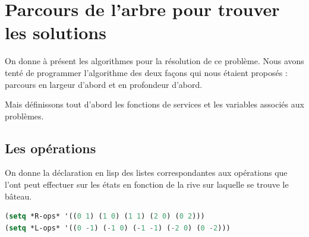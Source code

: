 \documentclass[a4paper, 12pt, leqno]{report}
\theoremstyle{plain}
\begin{document}
            
             \chapter{Parcours de l'arbre pour trouver les solutions}
             On donne à présent les algorithmes pour la résolution de ce problème. Nous avons tenté de programmer l'algorithme des deux façons qui nous étaient proposés : parcours en largeur d'abord et en profondeur d'abord.
             
             Mais définissons tout d'abord les fonctions de services et les variables associés aux problèmes.
             
             \section{Les opérations}
             On donne la déclaration en lisp des listes correspondantes aux opérations que l'ont peut effectuer sur les états en fonction de la rive sur laquelle se trouve le bâteau.
             \begin{lstlisting}[label=some-code,caption=Déclaration des opérations ,language=lisp]
(setq *R-ops* '((0 1) (1 0) (1 1) (2 0) (0 2))) 
(setq *L-ops* '((0 -1) (-1 0) (-1 -1) (-2 0) (0 -2)))
            \end{lstlisting} 
\end{document}
